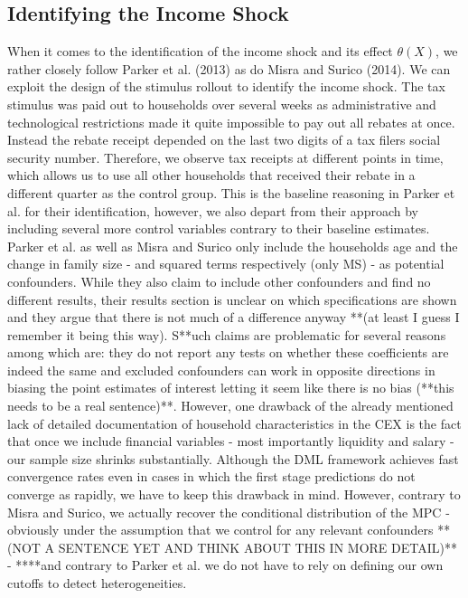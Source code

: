 \subsection{Identifying the Income Shock}
When it comes to the identification of the income shock and its effect $\theta(X)$, we rather closely follow Parker et al. (2013) as do Misra and Surico (2014). We can exploit the design of the stimulus rollout to identify the income shock. The tax stimulus was paid out to households over several weeks as administrative and technological restrictions made it quite impossible to pay out all rebates at once. Instead the rebate receipt depended on the last two digits of a tax filers social security number. Therefore, we observe tax receipts at different points in time, which allows us to use all other households that received their rebate in a different quarter as the control group. This is the baseline reasoning in Parker et al. for their identification, however, we also depart from their approach by including several more control variables contrary to their baseline estimates. Parker et al. as well as Misra and Surico only include the households age and the change in family size - and squared terms respectively (only MS) - as potential confounders. While they also claim to include other confounders and find no different results, their results section is unclear on which specifications are shown and they argue that there is not much of a difference anyway **(at least I guess I remember it being this way). S**uch claims are problematic for several reasons among which are: they do not report any tests on whether these coefficients are indeed the same and excluded confounders can work in opposite directions in biasing the point estimates of interest letting it seem like there is no bias (**this needs to be a real sentence)**. However, one drawback of the already mentioned lack of detailed documentation of household characteristics in the CEX is the fact that once we include financial variables - most importantly liquidity and salary - our sample size shrinks substantially. Although the DML framework achieves fast convergence rates even in cases in which the first stage predictions do not converge as rapidly, we have to keep this drawback in mind. However, contrary to Misra and Surico, we actually recover the conditional distribution of the MPC - obviously under the assumption that we control for any relevant confounders **(NOT A SENTENCE YET AND THINK ABOUT THIS IN MORE DETAIL)** - ****and contrary to Parker et al. we do not have to rely on defining our own cutoffs to detect heterogeneities. 

